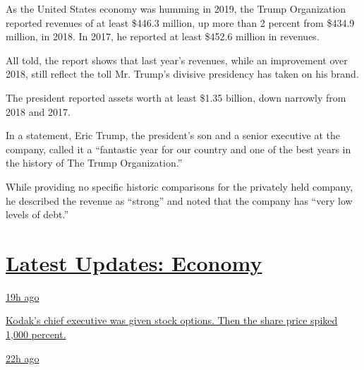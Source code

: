 As the United States economy was humming in 2019, the Trump Organization
reported revenues of at least \$446.3 million, up more than 2 percent
from \$434.9 million, in 2018. In 2017, he reported at least \$452.6
million in revenues.

All told, the report shows that last year's revenues, while an
improvement over 2018, still reflect the toll Mr. Trump's divisive
presidency has taken on his brand.

The president reported assets worth at least \$1.35 billion, down
narrowly from 2018 and 2017.

In a statement, Eric Trump, the president's son and a senior executive
at the company, called it a ``fantastic year for our country and one of
the best years in the history of The Trump Organization.''

While providing no specific historic comparisons for the privately held
company, he described the revenue as ``strong'' and noted that the
company has ``very low levels of debt.''

\hypertarget{latest-updates-economy}{%
\section{\texorpdfstring{\href{https://www.nytimes3xbfgragh.onion/live/2020/07/31/business/stock-market-today-coronavirus?action=click\&pgtype=Article\&state=default\&region=MAIN_CONTENT_1\&context=storylines_live_updates}{Latest
Updates:
Economy}}{Latest Updates: Economy}}\label{latest-updates-economy}}

\href{https://www.nytimes3xbfgragh.onion/live/2020/07/31/business/stock-market-today-coronavirus?action=click\&pgtype=Article\&state=default\&region=MAIN_CONTENT_1\&context=storylines_live_updates\#kodaks-chief-executive-was-given-stock-options-then-the-share-price-spiked-1000-percent}{19h
ago}

\href{https://www.nytimes3xbfgragh.onion/live/2020/07/31/business/stock-market-today-coronavirus?action=click\&pgtype=Article\&state=default\&region=MAIN_CONTENT_1\&context=storylines_live_updates\#kodaks-chief-executive-was-given-stock-options-then-the-share-price-spiked-1000-percent}{Kodak's
chief executive was given stock options. Then the share price spiked
1,000 percent.}

\href{https://www.nytimes3xbfgragh.onion/live/2020/07/31/business/stock-market-today-coronavirus?action=click\&pgtype=Article\&state=default\&region=MAIN_CONTENT_1\&context=storylines_live_updates\#fitch-ratings-downgrades-its-outlook-on-us-debt}{22h
ago}

